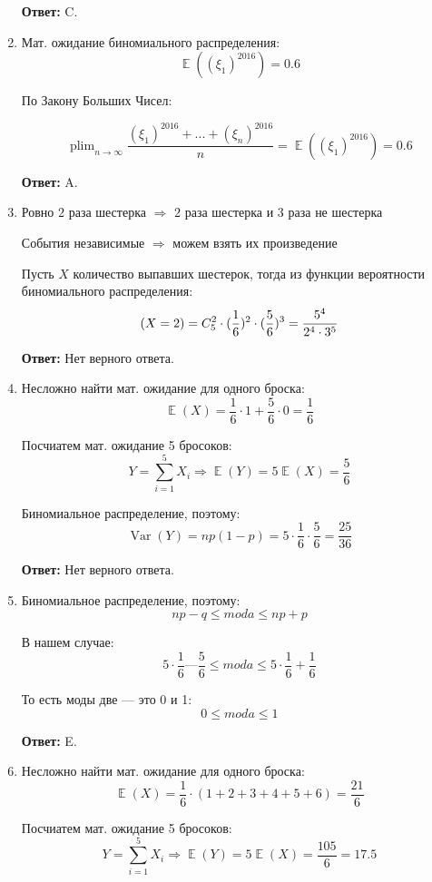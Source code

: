 \documentclass[a4paper]{article} %
\DeclareMathOperator*\plim{plim}
\DeclareMathOperator{\Var}{Var}
\DeclareMathOperator{\E}{\mathbb{E}}
\let\P\relax
\DeclareMathOperator{\P}{\mathbb{P}}
\renewcommand{\leq}{\leqslant}
\begin{document}
\begin{enumerate}
    \textbf{Ответ:} C.
    
    
    \item
    Мат. ожидание биномиального распределения:
    \[\E((\xi_1)^{2016}) = 0.6\]
    
    По Закону Больших Чисел:
    
    \[ \plim_{n\to\infty} \frac{(\xi_1)^{2016} + ... + (\xi_n)^{2016}}{n} = \E((\xi_1)^{2016}) = 0.6 \]
    
    \textbf{Ответ:} A.
    
    
    \item
    Ровно $2$ раза шестерка $\Rightarrow$ $2$ раза шестерка и  $3$ раза не шестерка
     
    События независимые $\Rightarrow$ можем взять их произведение
    
    Пусть $X$ количество выпавших шестерок, тогда из функции вероятности биномиального распределения:
    \[\P(X=2) = C_5^2 \cdot(\frac{1}{6})^2 \cdot (\frac{5}{6})^3 = \frac{5^4}{2^4\cdot3^5} \]
    
    \textbf{Ответ:} Нет верного ответа.
    
    
    \item
    Несложно найти мат. ожидание для одного броска:
    \[\E(X) = \frac{1}{6}\cdot1 + \frac{5}{6}\cdot0 = \frac{1}{6}\]
    
    Посчиатем мат. ожидание 5 бросоков:
    \[Y = \sum_{i=1}^{5} X_i \Rightarrow \E(Y) = 5\E(X) = \frac{5}{6}\]
    
    Биномиальное распределение, поэтому:
    \[\Var(Y) = np(1-p) = 5 \cdot \frac{1}{6} \cdot \frac{5}{6} = \frac{25}{36} \]
    
    \textbf{Ответ:} Нет верного ответа.
    
    
    \item
    Биномиальное распределение, поэтому:
    \[ np-q \leq moda \leq np+p \]
    
    В нашем случае:
    \[5 \cdot \frac{1}{6} — \frac{5}{6} \leq moda \leq 5 \cdot \frac{1}{6} + \frac{1}{6}\]
    
    То есть моды две — это 0 и 1:
    \[0 \leq moda \leq 1\]
    
    \textbf{Ответ:} E.
    
    
    \item
    Несложно найти мат. ожидание для одного броска:
    \[\E(X) = \frac{1}{6}\cdot(1 + 2 + 3 + 4 + 5 + 6) = \frac{21}{6}\]
    
    Посчиатем мат. ожидание 5 бросоков:
    \[Y = \sum_{i=1}^5 X_i \Rightarrow \E(Y) = 5\E(X) = \frac{105}{6} = 17.5\]
    

\end{enumerate}
\end{document}
